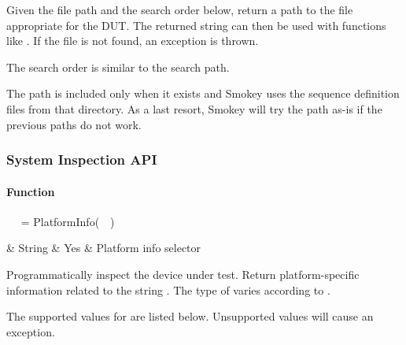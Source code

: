 Given the file path  and the search order below, return a
path to the file appropriate for the DUT.  The returned string can then be used
with functions like .  If the file is not found, an exception is
thrown.

The search order is similar to the  search path.

\begin{SearchPaths}
	\item {\LstStyle{}}
	\item {\LstStyle{}}
	\item {\LstStyle{}}
\end{SearchPaths}

The  path is included only when it exists and Smokey uses the
sequence definition files from that directory.  As a last resort, Smokey will
try the path  as-is if the previous paths do not work.

\subsubsection{System Inspection API}

\paragraph{ Function}

\begin{minipage}{\linewidth}
\begin{SmokeyApi}
~~ = PlatformInfo(~~)
\end{SmokeyApi}

\begin{ApiTable}
	 & String & Yes & Platform info selector \\
\end{ApiTable}
\end{minipage}

Programmatically inspect the device under test.  Return platform-specific
information related to the string .  The type of
 varies according to .

The supported values for  are listed below.  Unsupported values
will cause an exception.

